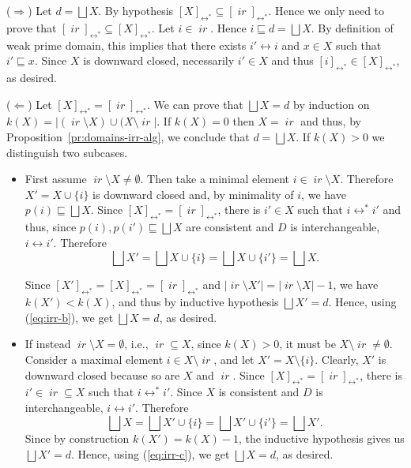 \documentclass[conference]{IEEEtran}
\renewenvironment{proof}{\begin{IEEEproof}}{\end{IEEEproof}}
\newcommand{\wi}{{interchangeable}}
\newcommand{\ir}[1]{\ensuremath{\mathop{\mathit{ir}({#1})}}}
\newcommand{\pred}[1]{\ensuremath{\mathit{p}({#1})}}
\newcommand{\eqclass}[2][]{\ensuremath{[{#2}]_{\scriptscriptstyle {#1}}}}
\newcommand{\eqclassir}[1]{\ensuremath{\eqclass[\leftrightarrow^*]{#1}}}
\begin{document}
\begin{proof}
  ($\Rightarrow$) Let $d = \bigsqcup X$. By hypothesis
  $\eqclassir{X} \subseteq \eqclassir{\ir{d}}$. Hence we only need to
  prove that $\eqclassir{\ir{d}} \subseteq \eqclassir{X}$. Let $i \in
  \ir{d}$. Hence $i \sqsubseteq d = \bigsqcup X$. By definition of
  weak prime domain, this implies that there exists
  $i' \leftrightarrow i$ and $x \in X$ such that $i' \sqsubseteq
  x$. Since $X$ is downward closed, necessarily $i' \in X$ and thus
  $\eqclassir{i} \in \eqclassir{X}$, as desired.

  \bigskip

  ($\Leftarrow$) Let $\eqclassir{X} = \eqclassir{\ir{d}}$. We can
  prove that $\bigsqcup X = d$ by induction on
  $k(X) = |(\ir{d} \setminus X) \cup (X \setminus \ir{d}|$. If $k(X)=0$ then $X = \ir{d}$ and thus, by
  Proposition~\ref{pr:domains-irr-alg}, we conclude that
  $d = \bigsqcup X$.
  If $k(X) > 0$ we distinguish two subcases.
  \begin{itemize}
  \item First assume
  $\ir{d} \setminus X \neq \emptyset$. Then take a minimal element
  $i \in \ir{d} \setminus X$. Therefore $X' = X \cup \{ i \}$ is
  downward closed and, by minimality of $i$, we have
  $\pred{i} \sqsubseteq \bigsqcup X$. Since
  $\eqclassir{X} = \eqclassir{\ir{d}}$, there is $i' \in X$ such that
  $i \leftrightarrow^* i'$ and thus, since
  $\pred{i}, \pred{i'} \sqsubseteq \bigsqcup X$ are consistent and $D$
  is {\wi}, $i \leftrightarrow i'$.  
  Therefore
  \begin{equation}
    \label{eq:irr-b}
    \bigsqcup X' = \bigsqcup X \cup \{ i \} = \bigsqcup X \cup \{ i' \}
    = \bigsqcup X.
  \end{equation}
  
  Since $\eqclassir{X'} =  \eqclassir{X}  =  \eqclassir{\ir{d}}$ and
  $|\ir{d} \setminus X'| = |\ir{d} \setminus X| -1$, we have
  $k(X') < k(X)$, and thus by inductive hypothesis $\bigsqcup X' =
  d$. Hence, using (\ref{eq:irr-b}), we get $\bigsqcup X = d$, as
  desired.
  
\item If instead $\ir{d} \setminus X = \emptyset$, i.e.,
  $\ir{d} \subseteq X$, since $k(X)>0$, it must be
  $X \setminus \ir{d} \neq \emptyset$. Consider a maximal element
  $i \in X \setminus \ir{d}$, and let $X' = X \setminus \{i\}$. Clearly, $X'$ is downward closed because so are $X$ and $\ir{d}$.  Since
  $\eqclassir{X} = \eqclassir{\ir{d}}$, there is
  $i' \in \ir{d} \subseteq X$ such that $i \leftrightarrow^* i'$. Since $X$ is consistent and $D$ is {\wi}, $i \leftrightarrow i'$. Therefore
    \begin{equation}
    \label{eq:irr-c}
    \bigsqcup X = \bigsqcup X' \cup \{ i \} = \bigsqcup X' \cup \{ i' \}
    = \bigsqcup X'.
  \end{equation}
  Since by construction $k(X') = k(X)-1$, the inductive hypothesis
  gives us $\bigsqcup X'=d$. Hence, using (\ref{eq:irr-c}), we get
  $\bigsqcup X = d$, as desired.
  \end{itemize}
\end{proof}
\end{document}
